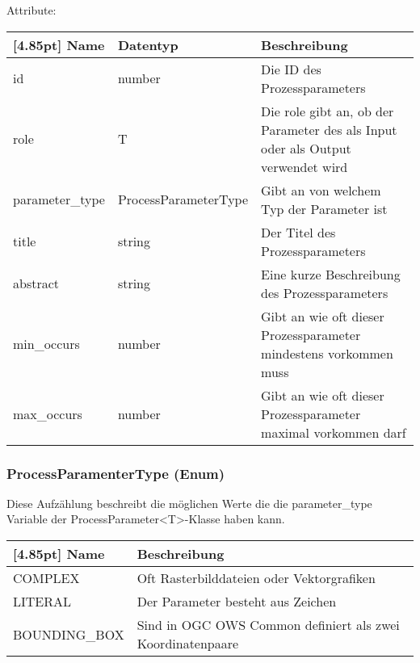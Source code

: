 			Attribute:
			\begin{center}
				\renewcommand{\arraystretch}{1.5}
				\setlength\tabcolsep{5pt}
				\begin{tabularx}{\textwidth}{|l|l|X|}
					\hline
					\rowcolor[gray]{0.75}[4.85pt]					
					Name & Datentyp & Beschreibung \\ \hline
					id & number & Die ID des Prozessparameters \\ \hline
					role & T & Die role gibt an, ob der Parameter des als Input oder als Output verwendet wird \\ \hline
					parameter_type & ProcessParameterType & Gibt an von welchem Typ der Parameter ist \\ \hline
					title & string & Der Titel des Prozessparameters \\ \hline
					abstract & string & Eine kurze Beschreibung des Prozessparameters \\ \hline
					min_occurs & number & Gibt an wie oft dieser Prozessparameter mindestens vorkommen muss \\ \hline
					max_occurs & number & Gibt an wie oft dieser Prozessparameter maximal vorkommen darf \\ \hline
				\end{tabularx}
			\end{center}
				
			\subsubsection{ProcessParamenterType (Enum)}
			
			Diese Aufzählung beschreibt die möglichen Werte die die parameter_type Variable der ProcessParameter<T>-Klasse haben kann.\newline
			
			\begin{center}
				\renewcommand{\arraystretch}{1.5}
				\setlength\tabcolsep{5pt}
				\begin{tabularx}{\textwidth}{|l|X|}
					\hline
					\rowcolor[gray]{0.75}[4.85pt]
					Name & Beschreibung \\ \hline
					COMPLEX & Oft Rasterbilddateien oder Vektorgrafiken \\ \hline
					LITERAL & Der Parameter besteht aus Zeichen \\ \hline
					BOUNDING_BOX & Sind in OGC OWS Common definiert als zwei Koordinatenpaare \\ \hline
				\end{tabularx}
			\end{center}
				
